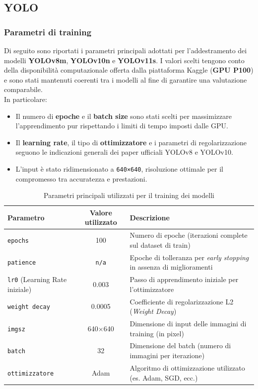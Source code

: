 \documentclass[12pt]{article}
\begin{document}
\subsection{YOLO}

\subsubsection{Parametri di training}

Di seguito sono riportati i parametri principali adottati per l’addestramento dei modelli \textbf{YOLOv8m}, \textbf{YOLOv10n} e \textbf{YOLOv11s}. I valori scelti tengono conto della disponibilità computazionale offerta dalla piattaforma Kaggle (\textbf{GPU P100}) e sono stati mantenuti coerenti tra i modelli al fine di garantire una valutazione comparabile.\\
In particolare:
\begin{itemize}
  \item Il numero di \textbf{epoche} e il \textbf{batch size} sono stati scelti per massimizzare l’apprendimento pur rispettando i limiti di tempo imposti dalle GPU.
  \item Il \textbf{learning rate}, il tipo di \textbf{ottimizzatore} e i parametri di regolarizzazione seguono le indicazioni generali dei paper ufficiali YOLOv8 e YOLOv10.
  \item L’input è stato ridimensionato a \texttt{640×640}, risoluzione ottimale per il compromesso tra accuratezza e prestazioni.
\end{itemize}
\begin{table}[H]
\centering
\begin{tabular}{|l|c|p{5.2cm}|}
\hline
\textbf{Parametro} & \textbf{Valore utilizzato} & \textbf{Descrizione} \\
\hline
\texttt{epochs} & 100 & Numero di epoche (iterazioni complete sul dataset di train) \\
\hline
\texttt{patience} & \texttt{n/a} & Epoche di tolleranza per \textit{early stopping} in assenza di miglioramenti \\
\hline
\texttt{lr0} (Learning Rate iniziale) & 0.003 & Passo di apprendimento iniziale per l’ottimizzatore \\
\hline
\texttt{weight decay} & 0.0005 & Coefficiente di regolarizzazione L2 (\textit{Weight Decay}) \\
\hline
\texttt{imgsz} & 640$\times$640 & Dimensione di input delle immagini di training (in pixel) \\
\hline
\texttt{batch} & 32 & Dimensione del batch (numero di immagini per iterazione) \\
\hline
\texttt{ottimizzatore} & Adam & Algoritmo di ottimizzazione utilizzato (es. Adam, SGD, ecc.) \\
\hline
\end{tabular}
\caption{Parametri principali utilizzati per il training dei modelli}
\label{tab:parametri-training}
\end{table}
\end{document}
